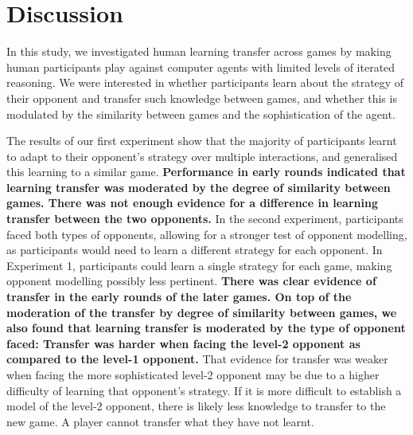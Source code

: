 \documentclass[english,man,floatsintext]{apa6}
\begin{document}
\hypertarget{discussion-2}{%
\section{Discussion}\label{discussion-2}}

In this study, we investigated human learning transfer across games by making human participants play against computer agents with limited levels of iterated reasoning. We were interested in whether participants learn about the strategy of their opponent and transfer such knowledge between games, and whether this is modulated by the similarity between games and the sophistication of the agent.

The results of our first experiment show that the majority of participants learnt to adapt to their opponent's strategy over multiple interactions, and generalised this learning to a similar game. \textbf{Performance in early rounds indicated that learning transfer was moderated by the degree of similarity between games. There was not enough evidence for a difference in learning transfer between the two opponents.} In the second experiment, participants faced both types of opponents, allowing for a stronger test of opponent modelling, as participants would need to learn a different strategy for each opponent. In Experiment 1, participants could learn a single strategy for each game, making opponent modelling possibly less pertinent. \textbf{There was clear evidence of transfer in the early rounds of the later games. On top of the moderation of the transfer by degree of similarity between games, we also found that learning transfer is moderated by the type of opponent faced: Transfer was harder when facing the level-2 opponent as compared to the level-1 opponent.} That evidence for transfer was weaker when facing the more sophisticated level-2 opponent may be due to a higher difficulty of learning that opponent's strategy. If it is more difficult to establish a model of the level-2 opponent, there is likely less knowledge to transfer to the new game. A player cannot transfer what they have not learnt.
\end{document}
